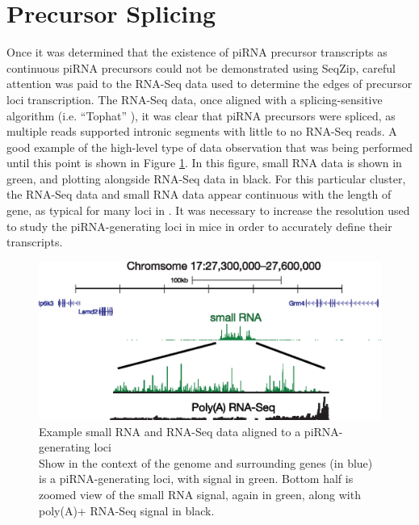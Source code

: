 \section{Precursor Splicing}
  \label{SeqZipMethod:sec:piRNA precursors are spliced}

  Once it was determined that the existence of piRNA precursor transcripts as continuous piRNA precursors could not be demonstrated using SeqZip, careful attention was paid to the RNA-Seq data used to determine the edges of precursor loci transcription. The RNA-Seq data, once aligned with a splicing-sensitive algorithm (i.e. ``Tophat'' \citep{Trapnell2009}), it was clear that piRNA precursors were spliced, as multiple reads supported intronic segments with little to no RNA-Seq reads. A good example of the high-level type of data observation that was being performed until this point is shown in Figure \ref{SeqZipMethod:fig:evidence for precusor splicing}. In this figure, small RNA data is shown in green, and plotting alongside RNA-Seq data in black. For this particular cluster, the RNA-Seq data and small RNA data appear continuous with the length of gene, as typical for many loci in \flies{}. It was necessary to increase the resolution used to study the piRNA-generating loci in mice in order to accurately define their transcripts.

  \begin{figure} %
    \centering 
    \includegraphics{Figures/SeqZipMethod/evidenceForPrecursorSplicing.eps}
    \caption[Example small RNA and RNA-Seq data aligned to a piRNA-generating loci]
    {
      Example small RNA and RNA-Seq data aligned to a piRNA-generating loci\\[0.25cm]
      Show in the context of the genome and surrounding genes (in blue) is a piRNA-generating loci, with signal in green. Bottom half is zoomed view of the small RNA signal, again in green, along with poly(A)+ RNA-Seq signal in black.
      }
    \label{SeqZipMethod:fig:evidence for precusor splicing}
    \end{figure}

